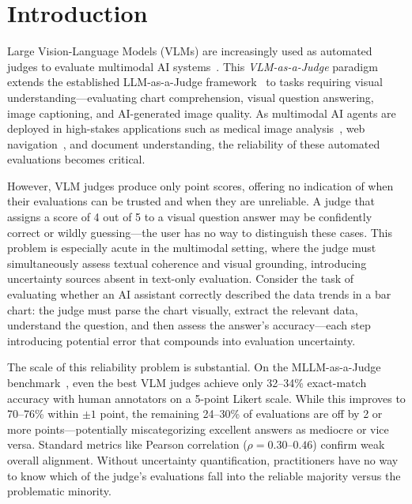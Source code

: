 \documentclass{article}
\begin{document}
\section{Introduction}
\label{sec:intro}

Large Vision-Language Models (VLMs) are increasingly used as automated judges to evaluate multimodal AI systems~\citep{chen2024mllmasajudge,li2024vlrewardbench}. This \emph{VLM-as-a-Judge} paradigm extends the established LLM-as-a-Judge framework~\citep{zheng2023judging} to tasks requiring visual understanding---evaluating chart comprehension, visual question answering, image captioning, and AI-generated image quality. As multimodal AI agents are deployed in high-stakes applications such as medical image analysis~\citep{chaves2025clinical}, web navigation~\citep{deng2023mind2web}, and document understanding, the reliability of these automated evaluations becomes critical.

However, VLM judges produce only point scores, offering no indication of when their evaluations can be trusted and when they are unreliable. A judge that assigns a score of 4 out of 5 to a visual question answer may be confidently correct or wildly guessing---the user has no way to distinguish these cases. This problem is especially acute in the multimodal setting, where the judge must simultaneously assess textual coherence and visual grounding, introducing uncertainty sources absent in text-only evaluation. Consider the task of evaluating whether an AI assistant correctly described the data trends in a bar chart: the judge must parse the chart visually, extract the relevant data, understand the question, and then assess the answer's accuracy---each step introducing potential error that compounds into evaluation uncertainty.

The scale of this reliability problem is substantial. On the MLLM-as-a-Judge benchmark~\citep{chen2024mllmasajudge}, even the best VLM judges achieve only 32--34\% exact-match accuracy with human annotators on a 5-point Likert scale. While this improves to 70--76\% within $\pm 1$ point, the remaining 24--30\% of evaluations are off by 2 or more points---potentially miscategorizing excellent answers as mediocre or vice versa. Standard metrics like Pearson correlation ($\rho = 0.30$--$0.46$) confirm weak overall alignment. Without uncertainty quantification, practitioners have no way to know which of the judge's evaluations fall into the reliable majority versus the problematic minority.
\end{document}
